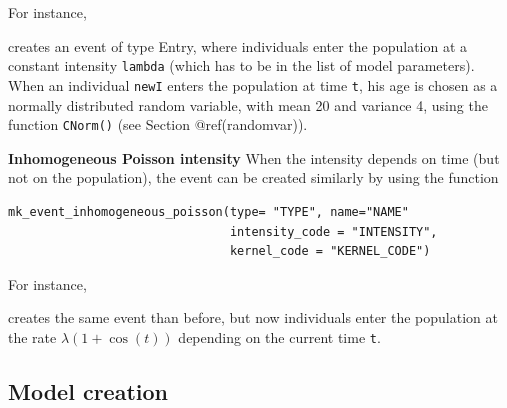 For instance,

\begin{Shaded}
\begin{Highlighting}[]
\NormalTok{(} \NormalTok{, } \NormalTok{,}
                  
\NormalTok{)}
\end{Highlighting}
\end{Shaded}

creates an event of type Entry, where individuals enter the population at a constant intensity \texttt{lambda} (which has to be in the list of model parameters). When an individual \texttt{newI} enters the population at time \texttt{t}, his age is chosen as a normally distributed random variable, with mean 20 and variance 4, using the function \texttt{CNorm()} (see Section @ref(randomvar)).

\textbf{Inhomogeneous Poisson intensity} When the intensity depends on time (but not on the population), the event can be created similarly by using the function

\begin{verbatim}
mk_event_inhomogeneous_poisson(type= "TYPE", name="NAME"
                               intensity_code = "INTENSITY",
                               kernel_code = "KERNEL_CODE")
\end{verbatim}

For instance,

\begin{Shaded}
\begin{Highlighting}[]
\NormalTok{(} \NormalTok{,}
                                \NormalTok{,}
                                
\NormalTok{)}
\end{Highlighting}
\end{Shaded}

creates the same event than before, but now individuals enter the population at the rate \(\lambda(1+ \cos(t))\) depending on the current time \texttt{t}.

\hypertarget{Modelcreation}{%
\subsection{Model creation}\label{Modelcreation}}


